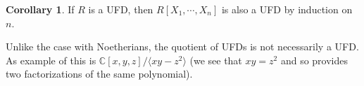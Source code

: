 \documentclass[]{article}
\theoremstyle{definition}
\newtheorem{corollary}{Corollary}[theorem]
\theoremstyle{definition}
\begin{document}
\begin{corollary}
  If \(R\) is a UFD, then \(R[X_1, \cdots, X_n]\) is also a UFD by induction on 
  \(n\).
\end{corollary}

Unlike the case with Noetherians, the quotient of UFDs is not necessarily a UFD.
As example of this is \(\mathbb{C}[x, y, z] /\langle xy - z^2 \rangle\) 
(we see that \(xy = z^2\) and so provides two factorizations of the same 
polynomial).
\end{document}
